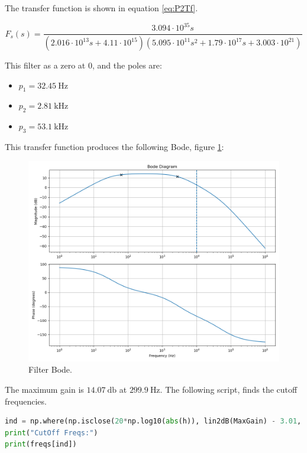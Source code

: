 The transfer function is shown in equation \ref{eq:P2Tf}.

\begin{equation}
    F_s(s) = \frac{3.094 \cdot 10^{35} s}{\left(2.016 \cdot 10^{13} s + 4.11 \cdot 10^{15}\right) \left(5.095 \cdot 10^{11}s^{2} + 1.79 \cdot 10^{17} s + 3.003 \cdot 10^{21}\right)}
    \label{eq:P2Tf}
\end{equation}

This filter as a zero at $0$, and the poles are:
\begin{itemize}
    \item $p_1 = \SI{32.45}{\hertz}$
    \item $p_2 = \SI{2.81}{\kilo\hertz}$
    \item $p_3 = \SI{53.1}{\kilo\hertz}$
\end{itemize}
This transfer function produces the following Bode, figure \ref{fig:P2BodePy}:

\begin{figure}[H]
    \centering
    \includegraphics*[scale = 0.6]{Images/P2BodePython.png}
    \caption{Filter Bode.}
    \label{fig:P2BodePy}
\end{figure}

The maximum gain is $\SI{14.07}{\decibel}$ at $\SI{299.9}{\hertz}$. The following script, finds the cutoff frequencies.

\begin{lstlisting}[language=python, caption = Cutt Off Frequencies]
ind = np.where(np.isclose(20*np.log10(abs(h)), lin2dB(MaxGain) - 3.01, atol=0.1))
print("CutOff Freqs:")
print(freqs[ind])
\end{lstlisting}

